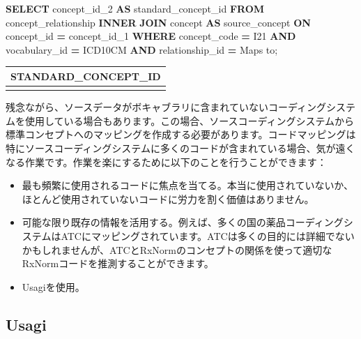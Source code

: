 \documentclass[
  11pt]{book}
\newenvironment{Shaded}{\begin{snugshade}}{\end{snugshade}}
\newcommand{\KeywordTok}[1]{\textcolor[rgb]{0.13,0.29,0.53}{\textbf{#1}}}
\newcommand{\NormalTok}[1]{#1}
\newcommand{\OperatorTok}[1]{\textcolor[rgb]{0.81,0.36,0.00}{\textbf{#1}}}
\newcommand{\StringTok}[1]{\textcolor[rgb]{0.31,0.60,0.02}{#1}}
\providecommand{\tightlist}{%
  \setlength{\itemsep}{0pt}\setlength{\parskip}{0pt}}
\theoremstyle{definition}
\theoremstyle{definition}
\theoremstyle{definition}
\theoremstyle{definition}
\theoremstyle{remark}
\begin{document}
\begin{Shaded}
\begin{Highlighting}[]
\KeywordTok{SELECT}\NormalTok{ concept\_id\_2 }\KeywordTok{AS}\NormalTok{ standard\_concept\_id}
\KeywordTok{FROM}\NormalTok{ concept\_relationship}
\KeywordTok{INNER} \KeywordTok{JOIN}\NormalTok{ concept }\KeywordTok{AS}\NormalTok{ source\_concept}
  \KeywordTok{ON}\NormalTok{ concept\_id }\OperatorTok{=}\NormalTok{ concept\_id\_1}
\KeywordTok{WHERE}\NormalTok{ concept\_code }\OperatorTok{=} \StringTok{\textquotesingle{}I21\textquotesingle{}}
  \KeywordTok{AND}\NormalTok{ vocabulary\_id }\OperatorTok{=} \StringTok{\textquotesingle{}ICD10CM\textquotesingle{}}
  \KeywordTok{AND}\NormalTok{ relationship\_id }\OperatorTok{=} \StringTok{\textquotesingle{}Maps to\textquotesingle{}}\NormalTok{;}
\end{Highlighting}
\end{Shaded}

\begin{longtable}[]{@{}r@{}}
\toprule\noalign{}
STANDARD\_CONCEPT\_ID \\
\midrule\noalign{}
\endhead
\bottomrule\noalign{}
\endlastfoot
312327 \\
\end{longtable}

残念ながら、ソースデータがボキャブラリに含まれていないコーディングシステムを使用している場合もあります。この場合、ソースコーディングシステムから標準コンセプトへのマッピングを作成する必要があります。コードマッピングは特にソースコーディングシステムに多くのコードが含まれている場合、気が遠くなる作業です。作業を楽にするために以下のことを行うことができます：

\begin{itemize}
\tightlist
\item
  最も頻繁に使用されるコードに焦点を当てる。本当に使用されていないか、ほとんど使用されていないコードに労力を割く価値はありません。
\item
  可能な限り既存の情報を活用する。例えば、多くの国の薬品コーディングシステムはATCにマッピングされています。ATCは多くの目的には詳細でないかもしれませんが、ATCとRxNormのコンセプトの関係を使って適切なRxNormコードを推測することができます。
\item
  Usagiを使用。
\end{itemize}

\subsection{Usagi}\label{usagi}
\end{document}
